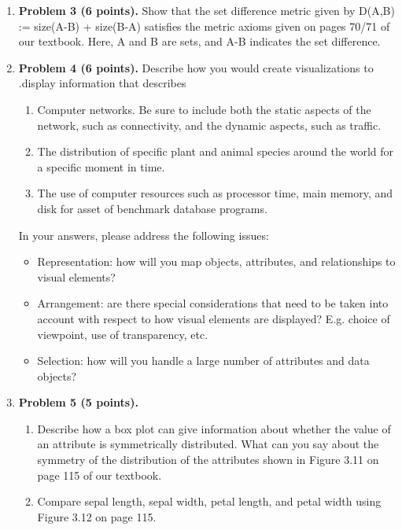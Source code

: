 \documentclass{article}%
\begin{document}
\begin{enumerate}
\begin{enumerate}
 \end{enumerate}
 
 \item\textbf{Problem 3 (6 points). } Show that the set difference metric given by D(A,B) := size(A-B) + size(B-A) satisfies the metric axioms given on pages 70/71 of our textbook. Here, A and B are sets, and A-B indicates the set difference.


\item \textbf{Problem 4 (6 points).} Describe how you would create visualizations to .display information that describes
 \begin{enumerate}
		\item Computer networks. Be sure to include both the static aspects of the network, such as connectivity, and the dynamic aspects, such as traffic.
		\item The distribution of specific plant and animal species around the world for a specific moment in time.
		\item The use of computer resources such as processor time, main memory, and disk for asset of benchmark database programs.
 \end{enumerate}
 
In your answers, please address the following issues:
\begin{itemize}
\item Representation: how will you map objects, attributes, and relationships to visual elements?
\item Arrangement: are there special considerations that need to be taken into account with respect to how visual elements are displayed? E.g. choice of viewpoint, use of transparency, etc.
\item Selection: how will you handle a large number of attributes and data objects?
\end{itemize}

\item \textbf{Problem 5 (5 points).}
 \begin{enumerate}
		\item Describe how a box plot can give information about whether the value of an attribute is symmetrically distributed. What can you say about the symmetry of the distribution of the attributes shown in Figure 3.11 on page 115 of our textbook.
		\item Compare sepal length, sepal width, petal length, and petal width using Figure 3.12 on page 115.
 \end{enumerate}



\end{enumerate}
\end{document}
